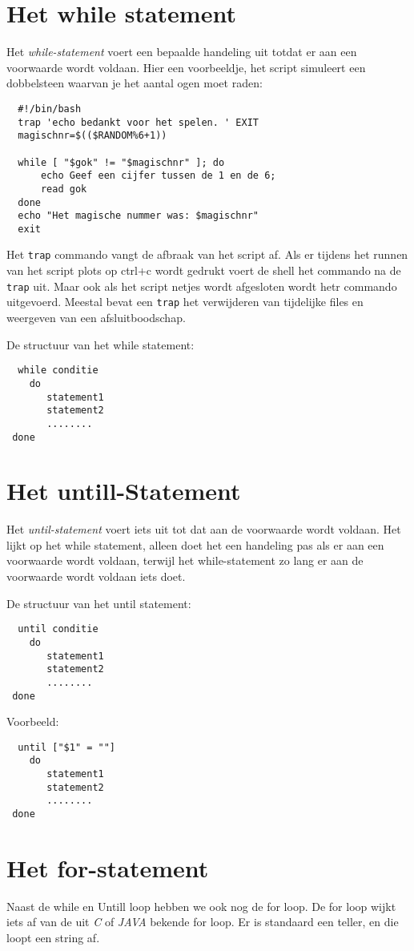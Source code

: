 \section{Het while statement}
Het \emph{while-statement} voert een bepaalde handeling uit totdat er aan een voorwaarde wordt voldaan. Hier een voorbeeldje, het script simuleert een dobbelsteen waarvan je het aantal ogen moet raden:
\begin{lstlisting}
  #!/bin/bash
  trap 'echo bedankt voor het spelen. ' EXIT
  magischnr=$(($RANDOM%6+1))
  
  while [ "$gok" != "$magischnr" ]; do
      echo Geef een cijfer tussen de 1 en de 6;
      read gok
  done
  echo "Het magische nummer was: $magischnr"
  exit
\end{lstlisting}%
Het \texttt{trap} commando vangt de afbraak van het script af. Als er tijdens het runnen van het script plots op ctrl+c wordt gedrukt voert de shell het commando na de \texttt{trap} uit. Maar ook als het script netjes wordt afgesloten wordt hetr commando uitgevoerd. Meestal bevat een \texttt{trap} het verwijderen van tijdelijke files en weergeven van een afsluitboodschap. 

De structuur van het while statement:
\begin{lstlisting}
  while conditie
    do
       statement1
       statement2
       ........
 done
\end{lstlisting}

\section{Het untill-Statement}
Het \emph{until-statement} voert iets uit tot dat aan de voorwaarde wordt voldaan. Het lijkt op het while statement, alleen doet het een handeling pas als er aan een voorwaarde wordt voldaan, terwijl het while-statement zo lang er aan de voorwaarde wordt voldaan iets doet.

De structuur van het until statement:
\begin{lstlisting}
  until conditie
    do
       statement1
       statement2
       ........
 done
\end{lstlisting}
Voorbeeld:
\begin{lstlisting}
  until ["$1" = ""]
    do
       statement1
       statement2
       ........
 done
\end{lstlisting}%

\section{Het for-statement}
Naast de while en Untill loop hebben we ook nog de for loop. De for loop wijkt iets af van de uit \emph{C} of \emph{JAVA} bekende for loop. Er is standaard een teller, en die loopt een string af. 

